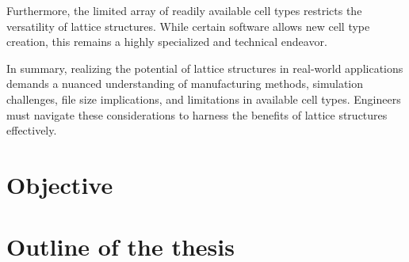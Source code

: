 Furthermore, the limited array of readily available cell types restricts the versatility of lattice structures. While certain software allows new cell type creation, this remains a highly specialized and technical endeavor.

In summary, realizing the potential of lattice structures in real-world applications demands a nuanced understanding of manufacturing methods, simulation challenges, file size implications, and limitations in available cell types. Engineers must navigate these considerations to harness the benefits of lattice structures effectively.



\section*{Objective}

\section*{Outline of the thesis}